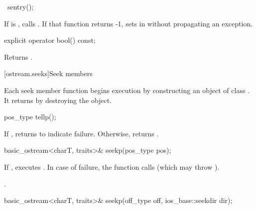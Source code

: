 %
\begin{itemdecl}
~sentry();
\end{itemdecl}

\begin{itemdescr}
\pnum
If
is
,
calls
. If that function returns -1, sets  in
 without propagating an exception.
\end{itemdescr}

%
\begin{itemdecl}
explicit operator bool() const;
\end{itemdecl}

\begin{itemdescr}
\pnum
\effects
Returns
.
\end{itemdescr}

[ostream.seeks]{Seek members}

\pnum
Each seek member function begins execution by constructing an object of class .
It returns by destroying the  object.

%
\begin{itemdecl}
pos_type tellp();
\end{itemdecl}

\begin{itemdescr}
\pnum
\returns
If
,
returns
to indicate failure.
Otherwise, returns
.
\end{itemdescr}

%
\begin{itemdecl}
basic_ostream<charT, traits>& seekp(pos_type pos);
\end{itemdecl}

\begin{itemdescr}
\pnum
\effects
If
,
executes
.
In case of failure, the function calls
(which may throw
).

\pnum
\returns
{}.
\end{itemdescr}

%
\begin{itemdecl}
basic_ostream<charT, traits>& seekp(off_type off, ios_base::seekdir dir);
\end{itemdecl}

